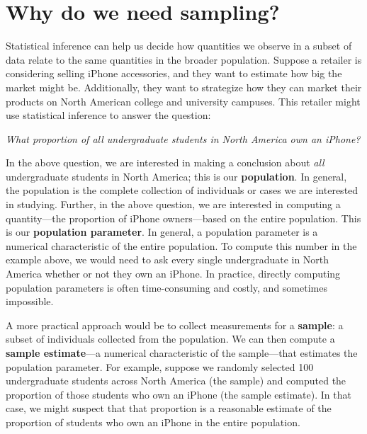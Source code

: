 \documentclass[
]{krantz}
\begin{document}
\hypertarget{why-do-we-need-sampling}{%
\section{Why do we need sampling?}\label{why-do-we-need-sampling}}

Statistical inference can help us decide how quantities we observe in
a subset of data relate to the same quantities in the broader
population. Suppose a retailer is considering selling iPhone accessories, and they want to estimate how big the market might be. Additionally, they want to strategize how they can market their products on North American college and university campuses. This retailer might use statistical inference to answer the question:

\emph{What proportion of all undergraduate students in North America own an iPhone?}

In the above question, we are interested in making a conclusion about \emph{all}
undergraduate students in North America; this is our \textbf{population}.
In general, the population is the complete collection of individuals or cases we are interested in studying.
Further, in the above question, we are interested in computing a quantity---the proportion
of iPhone owners---based on the entire population. This is our \textbf{population parameter}.
In general, a population parameter is a numerical characteristic
of the entire population. To compute this number in the example above, we would need to ask
every single undergraduate in North America whether or not they own an iPhone. In practice,
directly computing population parameters is often time-consuming and costly, and sometimes impossible.

A more practical approach would be to collect measurements for a \textbf{sample}: a subset of
individuals collected from the population. We can then compute a \textbf{sample estimate}---a numerical
characteristic of the sample---that estimates the population parameter. For example, suppose we randomly selected 100 undergraduate students across North America (the sample) and computed the proportion of those
students who own an iPhone (the sample estimate). In that case, we might suspect that that proportion is a reasonable estimate of the proportion of students who own an iPhone in the entire population.
\end{document}
